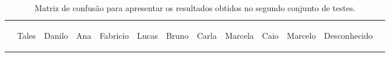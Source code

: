 	\begin{table}[htb]
		\begin{center}
			\caption{Matriz de confusão para apresentar os resultados obtidos no segundo conjunto de testes.}
			\label{tab:matriz-confusao2}
			  \begin{tabular}{|c|c|c|c|c|c|c|c|c|c|c|c|c|}

				\hline  & \bf \begin{sideways}Tales\end{sideways} & \bf \begin{sideways}Danilo\end{sideways} & \bf \begin{sideways}Ana\end{sideways} & \bf \begin{sideways}Fabricio\end{sideways} & \bf \begin{sideways}Lucas\end{sideways} & \bf \begin{sideways}Bruno\end{sideways} & \bf \begin{sideways}Carla\end{sideways} & \bf \begin{sideways}Marcela\end{sideways} & \bf \begin{sideways}Caio\end{sideways} & \bf \begin{sideways}Marcelo\end{sideways} & \bf \begin{sideways}Desconhecido\end{sideways}\\
				 

\end{tabular}
\end{center}
\end{table}
